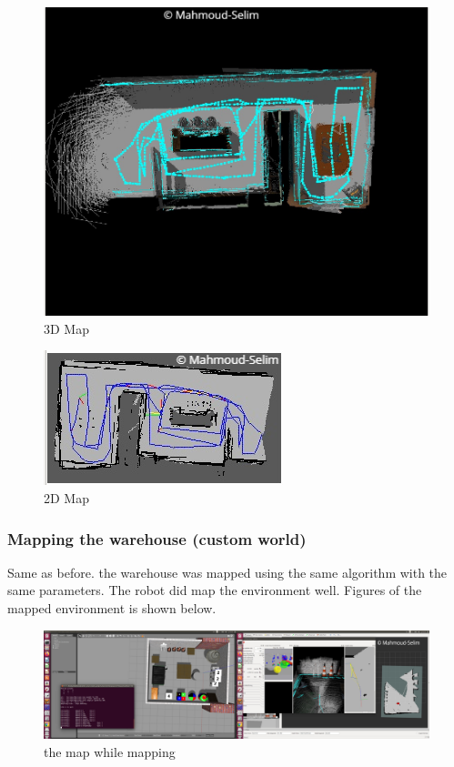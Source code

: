\documentclass[10pt,journal,compsoc]{IEEEtran}
\begin{document}
\begin{figure}[thpb]
      \centering
      \includegraphics[width=\linewidth]{provided_world_3D_map}
      \caption{3D Map}
\end{figure}

\begin{figure}[thpb]
      \centering
      \includegraphics[width=\linewidth]{provided_world_2D_map}
      \caption{2D Map}
\end{figure}


\subsubsection {Mapping the warehouse (custom world)}
Same as before. the warehouse was mapped using the same algorithm with the same parameters. The robot did map the environment well. Figures of the mapped environment is shown below.
\begin{figure}[thpb]
      \centering
      \includegraphics[width=\linewidth]{warehouse_world_partial_map}
      \caption{the map while mapping}
\end{figure}
\end{document}
